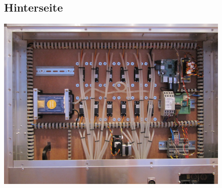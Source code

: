 \documentclass[12pt,letterpaper]{article}
\begin{document}
\begin{figure}
	\subsection{Hinterseite}
	\begin{center}
	\includegraphics[scale=0.5]{"hector9000-hinten.jpeg"}		
	\end{center}
	\end{figure}
	
	
	\newpage
	
	\begin{lstlisting}[language=bash]


	\end{lstlisting}
	
\end{document}
